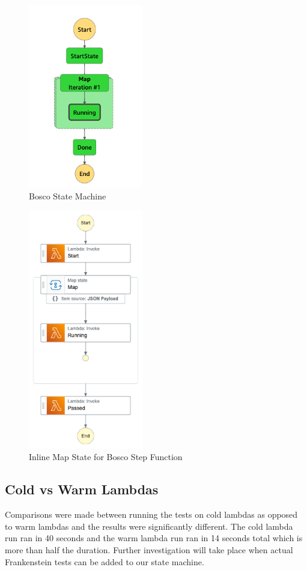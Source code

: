 \documentclass[12pt,a4paper,titlepage]{report}
\begin{document}
\begin{figure}[h]
  \centering
  \includegraphics[width=5cm]{./diagrams/step_function}
  \caption{Bosco State Machine}
\end{figure}

\begin{figure}[h]
  \centering
  \includegraphics[width=5cm]{./diagrams/state_machine}
  \caption{Inline Map State for Bosco Step Function}
\end{figure}

\subsection{Cold vs Warm Lambdas}

Comparisons were made between running the tests on cold lambdas as opposed to warm lambdas and the results were significantly different. The cold lambda run ran in 40 seconds and the warm lambda run ran in 14 seconds total which is more than half the duration. Further investigation will take place when actual Frankenstein tests can be added to our state machine.
\end{document}
